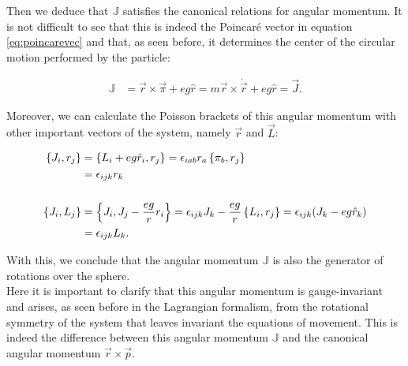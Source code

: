 Then we deduce that $\mathbb{J}$ satisfies the canonical relations for angular momentum. It is not difficult to see that this is indeed the Poincar\'e vector in equation \eqref{eq:poincarevec} and that, as seen before, it determines the center of the circular motion performed by the particle:

\begin{align*}
\mathbb{J} &= \vec{r}\times\vec{\pi}+{eg}\hat{r} = m{\vec{r}}\times\dot{\vec{r}} + eg\hat{r} = \vec{J}.
\end{align*}

Moreover, we can calculate the Poisson brackets of this angular momentum with other important vectors of the system, namely $\vec{r}$ and $\vec{L}$:

\begin{align*}
\left\lbrace J_i, r_j \right\rbrace &= \left\lbrace L_i+eg\hat{r}_i, r_j \right\rbrace =  \epsilon_{iab}r_a\left\lbrace \pi_b, r_j \right\rbrace \\
&= \epsilon_{ijk}r_k\\
\\
\left\lbrace J_i, L_j \right\rbrace &= \left\lbrace J_i, J_j-\frac{eg}{r}r_i \right\rbrace = \epsilon_{ijk}J_k-\frac{eg}{r}\left\lbrace L_i, r_j \right\rbrace =\epsilon_{ijk}(J_k-eg\hat{r}_k) \\
&= \epsilon_{ijk}L_k.
\end{align*}

With this, we conclude that the angular momentum $\mathbb{J}$ is also the generator of rotations over the sphere.\\

Here it is important to clarify that this angular momentum is gauge-invariant and arises, as seen before in the Lagrangian formalism, from the rotational symmetry of the system that leaves invariant the equations of movement. This is indeed the difference between this angular momentum $\mathbb{J}$ and the canonical angular momentum $\vec{r}\times\vec{p}$.









